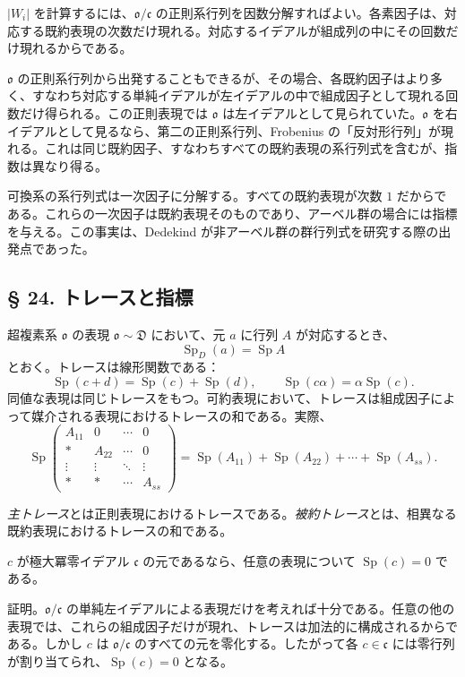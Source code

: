 \documentclass[11pt]{article}
\providecommand{\mo}{\mathfrak{o}}
\providecommand{\mc}{\mathfrak{c}}
\begin{document}
$|W_i|$ を計算するには、$\mo/\mc$ の正則系行列を因数分解すればよい。各素因子は、対応する既約表現の次数だけ現れる。対応するイデアルが組成列の中にその回数だけ現れるからである。

$\mo$ の正則系行列から出発することもできるが、その場合、各既約因子はより多く、すなわち対応する単純イデアルが左イデアルの中で組成因子として現れる回数だけ得られる。この正則表現では $\mo$ は左イデアルとして見られていた。$\mo$ を右イデアルとして見るなら、第二の正則系行列、Frobenius の「反対形行列」が現れる。これは同じ既約因子、すなわちすべての既約表現の系行列式を含むが、指数は異なり得る。

可換系の系行列式は一次因子に分解する。すべての既約表現が次数 $1$ だからである。これらの一次因子は既約表現そのものであり、アーベル群の場合には指標を与える。この事実は、Dedekind が非アーベル群の群行列式を研究する際の出発点であった。

\subsection*{§ 24. トレースと指標}

超複素系 $\mo$ の表現 $\mo\sim\mathfrak D$ において、元 $a$ に行列 $A$ が対応するとき、
\[
        \operatorname{Sp}_D(a)=\operatorname{Sp} A
\]
とおく。トレースは線形関数である：
\[
        \operatorname{Sp}(c+d)=\operatorname{Sp}(c)+\operatorname{Sp}(d),
        \qquad
        \operatorname{Sp}(c\alpha)=\alpha\operatorname{Sp}(c).
\]
同値な表現は同じトレースをもつ。可約表現において、トレースは組成因子によって媒介される表現におけるトレースの和である。実際、
\[
        \operatorname{Sp}\begin{pmatrix}
        A_{11}&0&\cdots&0\\
        *&A_{22}&\cdots&0\\
        \vdots&\vdots&\ddots&\vdots\\
        *&*&\cdots&A_{ss}
        \end{pmatrix}
        =\operatorname{Sp}(A_{11})+\operatorname{Sp}(A_{22})+\cdots+\operatorname{Sp}(A_{ss}).
\]

\emph{主トレース}とは正則表現におけるトレースである。\emph{被約トレース}とは、相異なる既約表現におけるトレースの和である。

$c$ が極大冪零イデアル $\mc$ の元であるなら、任意の表現について $\operatorname{Sp}(c)=0$ である。

証明。$\mo/\mc$ の単純左イデアルによる表現だけを考えれば十分である。任意の他の表現では、これらの組成因子だけが現れ、トレースは加法的に構成されるからである。しかし $c$ は $\mo/\mc$ のすべての元を零化する。したがって各 $c\in\mc$ には零行列が割り当てられ、$\operatorname{Sp}(c)=0$ となる。
\end{document}
